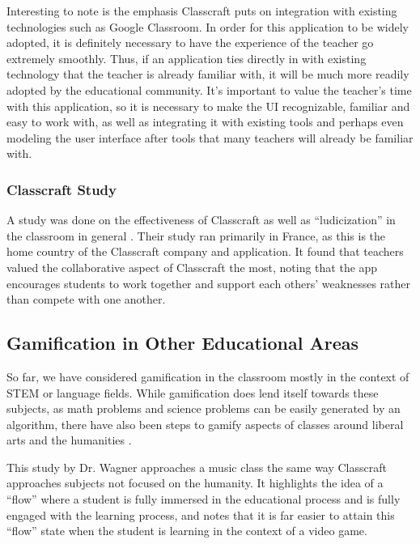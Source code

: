 Interesting to note is the emphasis Classcraft puts on integration with existing technologies such as Google Classroom. In order for this application to be widely adopted, it is definitely necessary to have the experience of the teacher go extremely smoothly. Thus, if an application ties directly in with existing technology that the teacher is already familiar with, it will be much more readily adopted by the educational community. It's important to value the teacher's time with this application, so it is necessary to make the UI recognizable, familiar and easy to work with, as well as integrating it with existing tools and perhaps even modeling the user interface after tools that many teachers will already be familiar with.

\subsubsection{Classcraft Study}
A study was done on the effectiveness of Classcraft as well as ``ludicization'' in the classroom in general \cite{sanchez2016classcraft}. Their study ran primarily in France, as this is the home country of the Classcraft company and application. It found that teachers valued the collaborative aspect of Classcraft the most, noting that the app encourages students to work together and support each others' weaknesses rather than compete with one another.

\subsection{Gamification in Other Educational Areas}
So far, we have considered gamification in the classroom mostly in the context of STEM or language fields. While gamification does lend itself towards these subjects, as math problems and science problems can be easily generated by an algorithm, there have also been steps to gamify aspects of classes around liberal arts and the humanities \cite{wagner2017digital}. 

This study by Dr. Wagner approaches a music class the same way Classcraft approaches subjects not focused on the humanity. It highlights the idea of a ``flow'' where a student is fully immersed in the educational process and is fully engaged with the learning process, and notes that it is far easier to attain this ``flow'' state when the student is learning in the context of a video game.